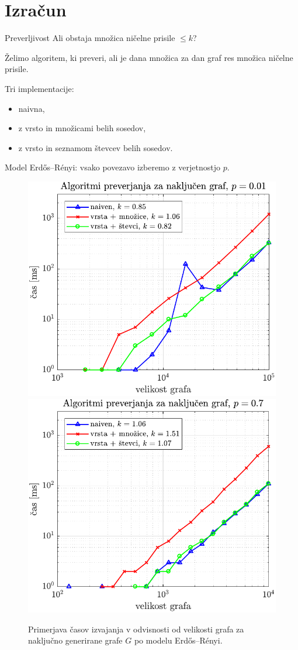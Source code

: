 \documentclass{beamer}
\begin{document}
\section{Izračun}
\begin{frame}{Preverljivost}
    Ali obstaja množica ničelne prisile $\leq k$?
    
    \bigskip
    
    Želimo algoritem, ki preveri, ali je dana množica za dan graf res množica ničelne prisile.
    
    \bigskip
    
    Tri implementacije:
    \begin{itemize}
        \item naivna,
        \item z vrsto in množicami belih sosedov,
        \item z vrsto in seznamom števcev belih sosedov.
    \end{itemize}
\end{frame}

\begin{frame}{}
    Model Erdős–Rényi: vsako povezavo izberemo z verjetnostjo $p$. 
    \begin{figure}
        \centering
        \includegraphics[width=0.49\linewidth]{../koda/results/plots/random_sparse.pdf}
        \includegraphics[width=0.49\linewidth]{../koda/results/plots/random_dense.pdf}
        \caption{Primerjava časov izvajanja v odvisnosti od velikosti grafa za naključno generirane grafe $G$ po modelu Erdős–Rényi.}
    \end{figure}
\end{frame}
\end{document}
